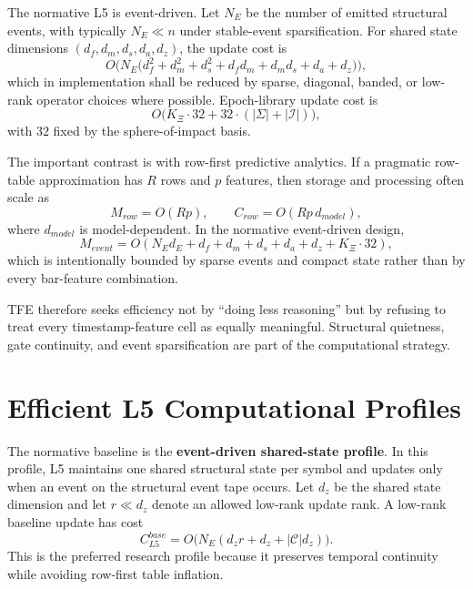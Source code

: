 The normative L5 is event-driven. Let $N_E$ be the number of emitted structural events, with typically $N_E\ll n$ under stable-event sparsification. For shared state dimensions $(d_f,d_m,d_s,d_a,d_z)$, the update cost is
\[
O\Big(N_E\big(d_f^2+d_m^2+d_s^2+d_f d_m+d_m d_s+d_a+d_z\big)\Big),
\]
which in implementation shall be reduced by sparse, diagonal, banded, or low-rank operator choices where possible. Epoch-library update cost is
\[
O\big(K_{\Xi}\cdot 32 + 32\cdot(|\Sigma|+|\mathcal{I}|)\big),
\]
with $32$ fixed by the sphere-of-impact basis.

The important contrast is with row-first predictive analytics. If a pragmatic row-table approximation has $R$ rows and $p$ features, then storage and processing often scale as
\[
M_{row}=O(Rp),\qquad C_{row}=O(Rp\,d_{model}),
\]
where $d_{model}$ is model-dependent. In the normative event-driven design,
\[
M_{event}=O(N_E d_E + d_f+d_m+d_s+d_a+d_z + K_{\Xi}\cdot 32),
\]
which is intentionally bounded by sparse events and compact state rather than by every bar-feature combination.

TFE therefore seeks efficiency not by ``doing less reasoning'' but by refusing to treat every timestamp-feature cell as equally meaningful. Structural quietness, gate continuity, and event sparsification are part of the computational strategy.

\section{Efficient L5 Computational Profiles}

The normative baseline is the \textbf{event-driven shared-state profile}. In this profile, L5 maintains one shared structural state per symbol and updates only when an event on the structural event tape occurs. Let $d_z$ be the shared state dimension and let $r\ll d_z$ denote an allowed low-rank update rank. A low-rank baseline update has cost
\[
C_{L5}^{base}=O\big(N_E(d_z r + d_z + |\mathcal{C}|d_z)\big).
\]
This is the preferred research profile because it preserves temporal continuity while avoiding row-first table inflation.


